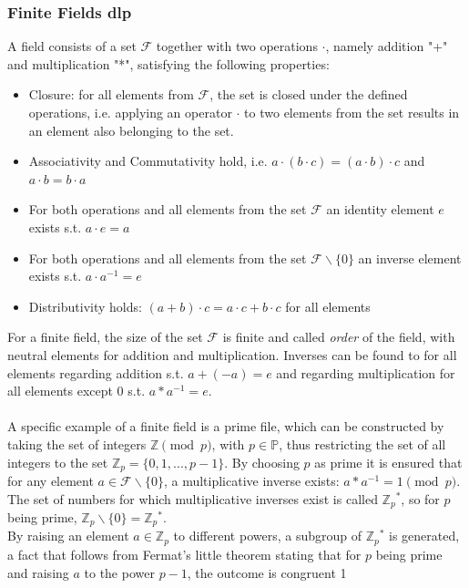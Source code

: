 \subsubsection{Finite Fields \gls{dlp}}
A field consists of a set $\mathcal{F}$ together with two operations $\cdot$, namely addition "+" and multiplication "*", satisfying the following properties:
\begin{itemize}
 \item  Closure: for all elements from $\mathcal{F}$, the set is closed under the defined operations, i.e. applying an operator $\cdot$ to two elements from the set results in an
element also belonging to the set.
 \item Associativity and Commutativity hold, i.e. $a \cdot (b \cdot c) = (a \cdot b) \cdot c$ and $a \cdot b = b \cdot a$
 \item For both operations and all elements from the set $\mathcal{F}$ an identity element $e$ exists s.t. $a\cdot e = a$
 \item For both operations and all elements from the set $\mathcal{F} \backslash \{0\}$ an inverse element exists s.t. $a\cdot a^{-1} = e$
 \item Distributivity holds: $(a+b) \cdot c = a \cdot c + b \cdot c$ for all elements 
\end{itemize}
For a finite field, the size of the set 
$\mathcal{F}$ is finite and called \textit{order} of the field, with neutral elements for addition and
multiplication. Inverses can be found to for all
elements regarding addition s.t. $a + (-a) = e$ and regarding multiplication for all elements except ${0}$ s.t. $a * a^{-1} = e$.
\\
\\
A specific example of a finite field is a prime file, which can be constructed by taking the set of integers $\mathbb{Z}\pmod p$, with $p \in \mathbb{P}$, thus
restricting the set of all integers to the set $\mathbb{Z}_p = \{0, 1, ..., p-1\}$.
By choosing $p$ as prime it is ensured that for any element $a \in \mathcal{F} \backslash\{0\}$, a multiplicative inverse exists: $ a * a^{-1} = 1 \pmod p$.
The set of numbers for which multiplicative inverses exist is called $\mathbb{Z}{_p}^*$, so for $p$ being prime, $\mathbb{Z}_p \backslash \{0\} = \mathbb{Z}{_p}^*$.
\\
By raising an element $a \in \mathbb{Z}_p$ to different powers, a subgroup of $\mathbb{Z}{_p}^*$
is generated, a fact that follows from Fermat's little theorem stating that for $p$ being prime and raising $a$ to the power $p-1$, the outcome is congruent 1

